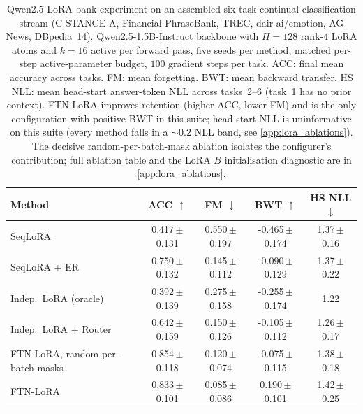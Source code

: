 \begin{table}[t]
\centering
\small
\caption{Qwen2.5 LoRA-bank experiment on an assembled six-task continual-classification stream (C-STANCE-A, Financial PhraseBank, TREC, dair-ai/emotion, AG News, DBpedia~14). Qwen2.5-1.5B-Instruct backbone with $H{=}128$ rank-$4$ LoRA atoms and $k{=}16$ active per forward pass, five seeds per method, matched per-step active-parameter budget, $100$ gradient steps per task. ACC: final mean accuracy across tasks. FM: mean forgetting. BWT: mean backward transfer. HS NLL: mean head-start answer-token NLL across tasks~2--6 (task~1 has no prior context). FTN-LoRA improves retention (higher ACC, lower FM) and is the only configuration with positive BWT in this suite; head-start NLL is uninformative on this suite (every method falls in a $\sim\!0.2$ NLL band, see \cref{app:lora_ablations}). The decisive random-per-batch-mask ablation isolates the configurer's contribution; full ablation table and the LoRA $B$ initialisation diagnostic are in \cref{app:lora_ablations}.}
\label{tab:lora_main}
\begin{tabular}{lcccc}
\toprule
Method & ACC $\uparrow$ & FM $\downarrow$ & BWT $\uparrow$ & HS NLL $\downarrow$ \\
\midrule
SeqLoRA & 0.417\,\scriptsize$\pm$0.131 & 0.550\,\scriptsize$\pm$0.197 & -0.465\,\scriptsize$\pm$0.174 & 1.37\,\scriptsize$\pm$0.16 \\
SeqLoRA + ER & 0.750\,\scriptsize$\pm$0.132 & 0.145\,\scriptsize$\pm$0.112 & -0.090\,\scriptsize$\pm$0.129 & 1.37\,\scriptsize$\pm$0.22 \\
Indep.\ LoRA (oracle) & 0.392\,\scriptsize$\pm$0.139 & 0.275\,\scriptsize$\pm$0.158 & -0.255\,\scriptsize$\pm$0.174 & 1.22 \\
Indep.\ LoRA + Router & 0.642\,\scriptsize$\pm$0.159 & 0.150\,\scriptsize$\pm$0.126 & -0.105\,\scriptsize$\pm$0.112 & 1.26\,\scriptsize$\pm$0.17 \\
FTN-LoRA, random per-batch masks & 0.854\,\scriptsize$\pm$0.118 & 0.120\,\scriptsize$\pm$0.074 & -0.075\,\scriptsize$\pm$0.115 & 1.38\,\scriptsize$\pm$0.18 \\
FTN-LoRA & 0.833\,\scriptsize$\pm$0.101 & 0.085\,\scriptsize$\pm$0.086 & 0.190\,\scriptsize$\pm$0.101 & 1.42\,\scriptsize$\pm$0.25 \\
\bottomrule
\end{tabular}
\end{table}
